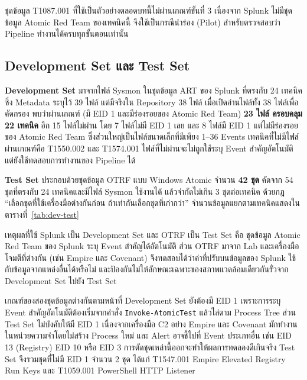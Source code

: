 ชุดข้อมูล T1087.001 ที่ใช้เป็นตัวอย่างตลอดบทนี้ไม่ผ่านเกณฑ์ขั้นที่ 3
เนื่องจาก Splunk ไม่มีชุดข้อมูล Atomic Red Team ของเทคนิคนี้
จึงใช้เป็นกรณีนำร่อง (Pilot) สำหรับตรวจสอบว่า Pipeline ทำงานได้ครบทุกขั้นตอนเท่านั้น

\subsection{Development Set และ Test Set}
\textbf{Development Set} มาจากไฟล์ Sysmon ในชุดข้อมูล ART ของ Splunk ที่ตรงกับ 24 เทคนิค
ซึ่ง Metadata ระบุไว้ 39 ไฟล์ แต่มีจริงใน Repository 38 ไฟล์
เมื่อเปิดอ่านไฟล์ทั้ง 38 ไฟล์เพื่อคัดกรอง พบว่าผ่านเกณฑ์ (มี EID 1 และมีร่องรอยของ Atomic Red Team) \textbf{23 ไฟล์ ครอบคลุม 22 เทคนิค}
อีก 15 ไฟล์ไม่ผ่าน โดย 7 ไฟล์ไม่มี EID 1 เลย และ 8 ไฟล์มี EID 1 แต่ไม่มีร่องรอยของ Atomic Red Team
ซึ่งส่วนใหญ่เป็นไฟล์ขนาดเล็กที่มีเพียง 1--36 Events
เทคนิคที่ไม่มีไฟล์ผ่านเกณฑ์คือ T1550.002 และ T1574.001
ไฟล์ที่ไม่ผ่านจะไม่ถูกใช้ระบุ Event สำคัญอัตโนมัติ แต่ยังใช้ทดสอบการทำงานของ Pipeline ได้

\textbf{Test Set} ประกอบด้วยชุดข้อมูล OTRF แบบ Windows Atomic จำนวน \textbf{42 ชุด}
คัดจาก 54 ชุดที่ตรงกับ 24 เทคนิคและมีไฟล์ Sysmon ใช้งานได้
แล้วจำกัดไม่เกิน 3 ชุดต่อเทคนิค ด้วยกฎ ``เลือกชุดที่ใช้เครื่องมือต่างกันก่อน ถ้าเท่ากันเลือกชุดที่เก่ากว่า''
จำนวนข้อมูลแยกตามเทคนิคแสดงในตารางที่~\ref{tab:dev-test}

เหตุผลที่ใช้ Splunk เป็น Development Set และ OTRF เป็น Test Set คือ
ชุดข้อมูล Atomic Red Team ของ Splunk ระบุ Event สำคัญได้อัตโนมัติ
ส่วน OTRF มาจาก Lab และเครื่องมือโจมตีที่ต่างกัน (เช่น Empire และ Covenant)
จึงทดสอบได้ว่าค่าที่ปรับบนข้อมูลของ Splunk ใช้กับข้อมูลจากแหล่งอื่นได้หรือไม่
และป้องกันไม่ให้ลักษณะเฉพาะของสภาพแวดล้อมเดียวกันรั่วจาก Development Set ไปยัง Test Set

เกณฑ์ของสองชุดข้อมูลต่างกันตามหน้าที่ Development Set ยังต้องมี EID 1
เพราะการระบุ Event สำคัญอัตโนมัติต้องเริ่มจากคำสั่ง \texttt{Invoke-AtomicTest} แล้วไล่ตาม Process Tree
ส่วน Test Set ไม่บังคับให้มี EID 1 เนื่องจากเครื่องมือ C2 อย่าง Empire และ Covenant มักทำงานในหน่วยความจำโดยไม่สร้าง Process ใหม่
และ Alert อาจชี้ไปที่ Event ประเภทอื่น เช่น EID 13 (Registry) EID 10 หรือ EID 3
การตัดชุดเหล่านี้ออกจะทำให้ผลการทดลองดีเกินจริง
Test Set จึงรวมชุดที่ไม่มี EID 1 จำนวน 2 ชุด ได้แก่ T1547.001 Empire Elevated Registry Run Keys
และ T1059.001 PowerShell HTTP Listener

